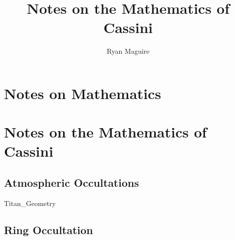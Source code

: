 \documentclass[crop=false,class=book,oneside]{standalone}
\begin{document}
    \ifx\ifresearch\undefined
        \title{Notes on the Mathematics of Cassini}
        \author{Ryan Maguire}
        \date{\vspace{-5ex}}
        \maketitle
        \tableofcontents
        \chapter*{Notes on Mathematics}
        \setcounter{chapter}{1}
    \else
        \chapter{Notes on the Mathematics of Cassini}
    \fi
    \section{Atmospheric Occultations}
        {Titan_Geometry}
    \section{Ring Occultation}
\end{document}
